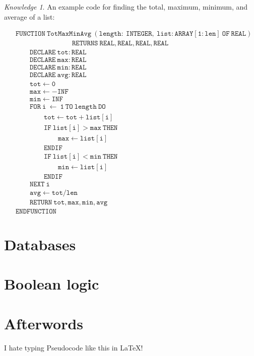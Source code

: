 \documentclass[8pt]{article}
\theoremstyle{remark}
\newtheorem{knowledge}{Knowledge}[subsection]
\begin{document}
            \begin{knowledge}
                An example code for finding the total, maximum, minimum, and average of a list:

                \begin{align*}
                    &\mathtt{FUNCTION\ TotMaxMinAvg\ (length:\ INTEGER,\ list:ARRAY [1:len]\ OF\ REAL)}\\
                    &\qquad \qquad \qquad \qquad \mathtt{RETURNS\ REAL, REAL, REAL, REAL}\\
                    &\qquad \mathtt{DECLARE\ tot:REAL}\\
                    &\qquad \mathtt{DECLARE\ max:REAL}\\
                    &\qquad \mathtt{DECLARE\ min:REAL}\\
                    &\qquad \mathtt{DECLARE\ avg:REAL}\\
                    &\qquad \mathtt{tot \leftarrow 0}\\
                    &\qquad \mathtt{max \leftarrow -INF}\\
                    &\qquad \mathtt{min \leftarrow INF}\\
                    &\qquad \mathtt{FOR\ i\ \leftarrow\ 1\ TO\ length\ DO}\\
                    &\qquad \qquad \mathtt{tot \leftarrow tot + list[i]}\\
                    &\qquad \qquad \mathtt{IF\ list[i] > max\ THEN}\\
                    &\qquad \qquad \qquad \mathtt{max \leftarrow list[i]}\\
                    &\qquad \qquad \mathtt{ENDIF}\\
                    &\qquad \qquad \mathtt{IF\ list[i] < min\ THEN}\\
                    &\qquad \qquad \qquad \mathtt{min \leftarrow list[i]}\\
                    &\qquad \qquad \mathtt{ENDIF}\\
                    &\qquad \mathtt{NEXT\ i}\\
                    &\qquad \mathtt{avg \leftarrow tot / len}\\
                    &\qquad \mathtt{RETURN\ tot, max, min, avg}\\
                    &\mathtt{ENDFUNCTION}
                \end{align*}
            \end{knowledge}
    \section{Databases}

    \section{Boolean logic}

    \section*{Afterwords}
        I hate typing Pseudocode like this in \LaTeX!
\end{document}
